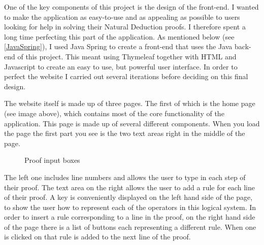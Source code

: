 One of the key components of this project is the design of the front-end. I wanted to make the application as easy-to-use and as appealing as possible to users looking for help in solving their Natural Deduction proofs. I therefore spent a long time perfecting this part of the application. As mentioned below (see \ref{JavaSpring}), I used Java Spring to create a front-end that uses the Java back-end of this project. This meant using Thymeleaf together with HTML and Javascript to create an easy to use, but powerful user interface. In order to perfect the website I carried out several iterations before deciding on this final design.



The website itself is made up of three pages. The first of which is the home page (see image above), which contains most of the core functionality of the application. This page is made up of several different components. When you load the page the first part you see is the two text areas right in the middle of the page. 

\begin{figure}[!ht]
	\centering
	\caption{Proof input boxes}
\end{figure}


The left one includes line numbers and allows the user to type in each step of their proof. The text area on the right allows the user to add a rule for each line of their proof. A key is conveniently displayed on the left hand side of the page, to show the user how to represent each of the operators in this logical system. In order to insert a rule corresponding to a line in the proof, on the right hand side of the page there is a list of buttons each representing a different rule. When one is clicked on that rule is added to the next line of the proof. 

